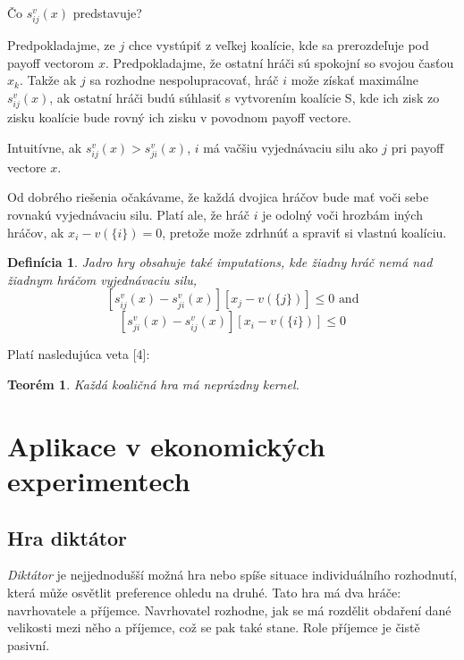 \documentclass[a5paper,12pt]{article}
\newtheorem*{thm}{Teor\'em}
\newtheorem*{mydef}{Defin\'icia}
\begin{document}
      \v{C}o $s_{ij}^{v}(x)$ predstavuje? 

      Predpokladajme, ze $j$ chce vyst\'upi\v{t} z ve\v{l}kej koal\'icie, kde sa prerozde\v{l}uje pod payoff vectorom $x$. Predpokladajme, \v{z}e ostatn\'i hr\'a\v{c}i s\'u spokojn\'i so svojou \v{c}as\v{t}ou $x_{k}$. Tak\v{z}e ak $j$ sa rozhodne nespolupracova\v{t}, hr\'a\v{c} $i$ mo\v{z}e z\'iska\v{t} maxim\'alne $s_{ij}^{v}(x)$, ak ostatn\'i hr\'a\v{c}i bud\'u s\'uhlasi\v{t} s vytvoren\'im koal\'icie S, kde ich zisk zo zisku koal\'icie bude rovn\'y ich zisku v povodnom payoff vectore. 

      Intuit\'ivne, ak $s_{ij}^{v}(x) > s_{ji}^{v}(x)$, $i$ m\'a va\v{c}\v{s}iu vyjedn\'avaciu silu ako $j$ pri payoff vectore $x$.

      Od dobr\'eho rie\v{s}enia o\v{c}ak\'avame, \v{z}e ka\v{z}d\'a dvojica hr\'a\v{c}ov bude ma\v{t} vo\v{c}i sebe rovnak\'u vyjedn\'avaciu silu. Plat\'i ale, \v{z}e hr\'a\v{c} $i$ je odoln\'y vo\v{c}i hrozb\'am in\'ych hr\'a\v{c}ov, ak $x_{i}-v(\{i\})=0$, preto\v{z}e mo\v{z}e zdrhn\'u\v{t} a spravi\'t si vlastn\'u koal\'iciu.

      \begin{mydef}
      Jadro hry obsahuje tak\'e imputations, kde \v{z}iadny hr\'a\v{c} nem\'a nad \v{z}iadnym hr\'a\v{c}om vyjedn\'avaciu silu, 
      \[ [s_{ij}^{v}(x) - s_{ji}^{v}(x)][x_{j}-v(\{j\})] \leq 0 \textrm{ and}\]
      \[ [s_{ji}^{v}(x) - s_{ij}^{v}(x)][x_{i}-v(\{i\})] \leq 0 \]

      \end{mydef}

      Plat\'i nasleduj\'uca veta [4]:

      \begin{thm}
      Ka\v{z}d\'a koali\v{c}n\'a hra m\'a nepr\'azdny kernel. 
      \end{thm}

\clearpage
  \section{Aplikace v ekonomických experimentech}
    \subsection{Hra diktátor}
      \emph{Diktátor} je nejjednodušší možná hra nebo spíše situace individuálního rozhodnutí,
      která může osvětlit preference ohledu na druhé. Tato hra má dva hráče: navrhovatele a příjemce.
      Navrhovatel rozhodne, jak se má rozdělit obdaření dané velikosti mezi něho a příjemce,
      což se pak také stane. Role příjemce je čistě pasivní.
\end{document}
